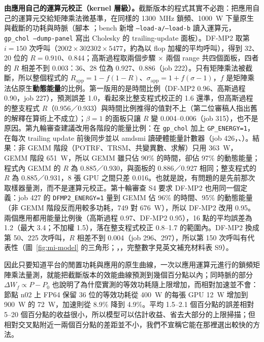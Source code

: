 \textbf{由應用自己的運算元校正（kernel 層級）。}截斷版本的程式其實不必跑：把應用自己的運算元交給矩陣乘法微基準，在同樣的 1300~MHz 鎖頻、1000~W 下量原生與截斷的功耗與時脈（腳本 ；bench 新增 \texttt{--load-a/--load-b} 讀入運算元，\texttt{gp\_chol --dump-panel} 寫出 Cholesky 的 trailing-update 面板）。DF-MP2 取第 $i=150$ 次呼叫（$2002\times302302\times5477$，約為以 flop 加權的平均呼叫），得到 32、20 位的 $R=0.910$、0.844；高斯過程取兩個步驟 × 兩個 range 共四個面板，四者的 $R$ 相差不到 0.003：36、28 位為 0.927、0.886（job 222）。只有矩陣乘法被截斷，所以整個程式的 $R_\mathrm{app}=1-f(1-R)$、$\sigma_\mathrm{app}=1+f(\sigma-1)$，$f$ 是矩陣乘法佔原生\textbf{動態能量}的比例。第一版用的是時間比例（DF-MP2 0.96、高斯過程 0.90，job 227），預測誤差 1.0，看起來比整支程式校正的 1.6 還準，但高斯過程的整支程式 $R$（0.956／0.933）與時間比例推得的值對不上（第二位審稿人指出舊的解釋在算術上不成立）；$\beta=1$ 的面板只讓 $R$ 變 0.004–0.006（job 315），也不是原因。第九輪審查建議改用各階段的能量比例：在 \texttt{gp\_chol} 加上 \texttt{GP\_ENERGY=1}，在每次 trailing update 前後同步並以 amdsmi 讀硬體能量計數器（job 426，、）。結果：非 GEMM 階段（POTRF、TRSM、共變異數、求解）只用 363~W，GEMM 階段 651~W，所以 GEMM 雖只佔 90\% 的時間，卻佔 97\% 的動態能量；程式內 GEMM 的 $R$ 為 0.885／0.930，與面板的 0.886／0.927 相同；整支程式的 $R$ 為 0.885／0.931，8 張 GPU 之間只差 0.016。也就是說，有問題的是先前那次取樣器量測，而不是運算元校正。第十輪審查 S4 要求 DF-MP2 也用同一個定義：job 427 的 \texttt{DFMP2\_ENERGY=1} 量到 GEMM 佔 96\% 的時間、95\% 的動態能量（非 GEMM 階段反而用較多功耗，749 對 676~W），所以 DF-MP2 改用 0.95。兩個應用都用能量比例後（高斯過程 0.97、DF-MP2 0.95），16 點的平均誤差為 1.2（最大 3.4；不加權 1.5），落在整支程式校正 0.8–1.7 的範圍內。DF-MP2 換成第 50、225 次呼叫，$R$ 相差不到 0.004（job 296、297），所以第 150 次呼叫有代表性（圖~\ref{fig:mi-model} 的三角形；，，完整數字見英文補充材料表 S9）。

因此只要知道平台的閒置功耗與應用的原生曲線，一次以應用運算元進行的鎖頻矩陣乘法量測，就能把截斷版本的效能曲線預測到幾個百分點以內；同時脈的部分 $\Delta W_f\propto P-P_0$ 也說明了為什麼實測的等效功耗隨上限增加，而相對加速並不會：節點 n02 上 FP64 保留 36 位的等效功耗從 400~W 的每張 GPU 12~W 增加到 900~W 的 72~W，加速則從 8.9\% 降到 4.9\%。平均 1.5–2.1 個百分點的誤差相對 5–20 個百分點的收益很小，所以模型可以估計收益、省去大部分的上限掃描；但相對交叉點附近一兩個百分點的差距並不小，我們不宣稱它能在那裡選出較快的方法。

